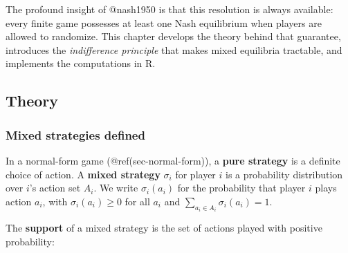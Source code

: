 \documentclass[
]{article}
\begin{document}
The profound insight of @nash1950 is that this resolution is always
available: every finite game possesses at least one Nash equilibrium
when players are allowed to randomize. This chapter develops the theory
behind that guarantee, introduces the \emph{indifference principle} that
makes mixed equilibria tractable, and implements the computations in R.

\subsection{Theory}\label{theory}

\subsubsection{Mixed strategies defined}\label{mixed-strategies-defined}

In a normal-form game (@ref(sec-normal-form)), a \textbf{pure strategy}
is a definite choice of action. A \textbf{mixed strategy} \(\sigma_i\)
for player \(i\) is a probability distribution over \(i\)'s action set
\(A_i\). We write \(\sigma_i(a_i)\) for the probability that player
\(i\) plays action \(a_i\), with \(\sigma_i(a_i) \geq 0\) for all
\(a_i\) and \(\sum_{a_i \in A_i} \sigma_i(a_i) = 1\).

The \textbf{support} of a mixed strategy is the set of actions played
with positive probability:
\end{document}
